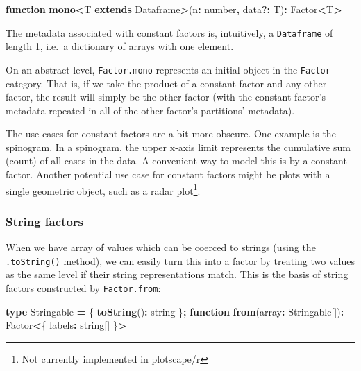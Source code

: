 \documentclass[
]{book}
\newenvironment{Shaded}{\begin{snugshade}}{\end{snugshade}}
\newcommand{\DataTypeTok}[1]{\textcolor[rgb]{0.13,0.29,0.53}{#1}}
\newcommand{\FunctionTok}[1]{\textcolor[rgb]{0.13,0.29,0.53}{\textbf{#1}}}
\newcommand{\KeywordTok}[1]{\textcolor[rgb]{0.13,0.29,0.53}{\textbf{#1}}}
\newcommand{\NormalTok}[1]{#1}
\newcommand{\OperatorTok}[1]{\textcolor[rgb]{0.81,0.36,0.00}{\textbf{#1}}}
\theoremstyle{definition}
\theoremstyle{definition}
\theoremstyle{definition}
\theoremstyle{definition}
\theoremstyle{remark}
\begin{document}
\begin{Shaded}
\begin{Highlighting}[]
\KeywordTok{function} \FunctionTok{mono}\OperatorTok{\textless{}}\NormalTok{T }\KeywordTok{extends}\NormalTok{ Dataframe}\OperatorTok{\textgreater{}}\NormalTok{(n}\OperatorTok{:} \DataTypeTok{number}\OperatorTok{,}\NormalTok{ data}\OperatorTok{?:}\NormalTok{ T)}\OperatorTok{:}\NormalTok{ Factor}\OperatorTok{\textless{}}\NormalTok{T}\OperatorTok{\textgreater{}} 
\end{Highlighting}
\end{Shaded}

The metadata associated with constant factors is, intuitively, a \texttt{Dataframe} of length 1, i.e.~a dictionary of arrays with one element.

On an abstract level, \texttt{Factor.mono} represents an initial object in the \texttt{Factor} category. That is, if we take the product of a constant factor and any other factor, the result will simply be the other factor (with the constant factor's metadata repeated in all of the other factor's partitions' metadata).

The use cases for constant factors are a bit more obscure. One example is the spinogram. In a spinogram, the upper x-axis limit represents the cumulative sum (count) of all cases in the data. A convenient way to model this is by a constant factor. Another potential use case for constant factors might be plots with a single geometric object, such as a radar plot\footnote{Not currently implemented in plotscape/r}.

\subsubsection{String factors}\label{string-factors}

When we have array of values which can be coerced to strings (using the \texttt{.toString()} method), we can easily turn this into a factor by treating two values as the same level if their string representations match. This is the basis of string factors constructed by \texttt{Factor.from}:

\begin{Shaded}
\begin{Highlighting}[]
\KeywordTok{type}\NormalTok{ Stringable }\OperatorTok{=}\NormalTok{ \{ }\FunctionTok{toString}\NormalTok{()}\OperatorTok{:} \DataTypeTok{string}\NormalTok{ \}}\OperatorTok{;}
\KeywordTok{function} \FunctionTok{from}\NormalTok{(array}\OperatorTok{:}\NormalTok{ Stringable[])}\OperatorTok{:}\NormalTok{ Factor}\OperatorTok{\textless{}}\NormalTok{\{ labels}\OperatorTok{:} \DataTypeTok{string}\NormalTok{[] \}}\OperatorTok{\textgreater{}} 
\end{Highlighting}
\end{Shaded}
\end{document}

